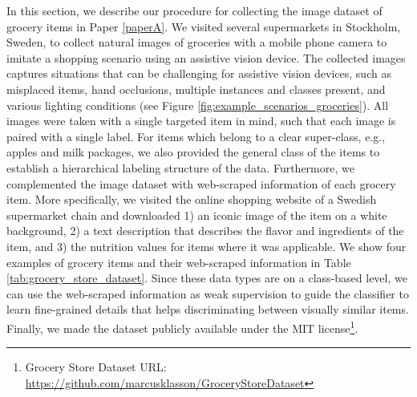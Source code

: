 In this section, we describe our procedure for collecting the image dataset of grocery items in Paper \ref{paperA}. We visited several supermarkets in Stockholm, Sweden, to collect natural images of groceries with a mobile phone camera to imitate a shopping scenario using an assistive vision device. The collected images captures situations that can be challenging for assistive vision devices, such as misplaced items, hand occlusions, multiple instances and classes present, and various lighting conditions (see Figure \ref{fig:example_scenarios_groceries}). All images were taken with a single targeted item in mind, such that each image is paired with a single label. For items which belong to a clear super-class, e.g., apples and milk packages, we also provided the general class of the items to establish a hierarchical labeling structure of the data. Furthermore, we complemented the image dataset with web-scraped information of each grocery item. More specifically, we visited the online shopping website of a Swedish supermarket chain and downloaded 1) an iconic image of the item on a white background, 2) a text description that describes the flavor and ingredients of the item, and 3) the nutrition values for items where it was applicable. We show four examples of grocery items and their web-scraped information in Table \ref{tab:grocery_store_dataset}. Since these data types are on a class-based level, we can use the web-scraped information as weak supervision to guide the classifier to learn fine-grained details that helps discriminating between visually similar items. Finally, we made the dataset publicly available under the MIT license\footnote{Grocery Store Dataset URL: \url{https://github.com/marcusklasson/GroceryStoreDataset}}.


